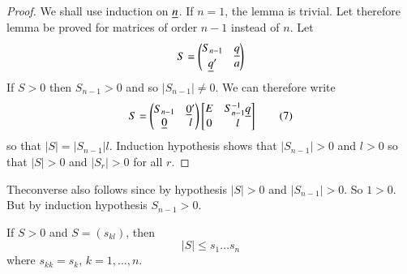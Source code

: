 \begin{proof}
We shall use induction on $\underline{n}$. If $n=1$, the lemma is
trivial. Let therefore lemma be proved for matrices of order $n-1$
instead of $n$. Let
$$
S=
\begin{pmatrix}
S_{n-1} & \underline{q}\\
\underline{q}' & a
\end{pmatrix}
$$
If $S>0$ then $S_{n-1}>0$ and so $|S_{n-1}|\neq 0$. We can therefore
write
\begin{equation*}
S=
\begin{pmatrix}
S_{n-1} & \underline{0}'\\
\underline{0} & l
\end{pmatrix}
\begin{bmatrix}
E & S^{-1}_{n-1}\underline{q}\\
0 & l
\end{bmatrix}\tag{7}\label{c2:eq7}
\end{equation*}
so that $|S|=|S_{n-1}|l$. Induction hypothesis shows that
$|S_{n-1}|>0$ and $l>0$ so that $|S|>0$ and $|S_{r}|>0$ for all $r$. 
\end{proof}

The\pageoriginale converse also follows since by hypothesis $|S|>0$
and $|S_{n-1}|>0$. So $1>0$. But by induction hypothesis $S_{n-1}>0$.

\begin{lem}\label{chap2:lem2}
If $S>0$ and $S=(s_{kl})$, then
$$
|S|\leq s_{1}\ldots s_{n}
$$
where $s_{kk}=s_{k}$, $k=1,\ldots,n$.
\end{lem}

